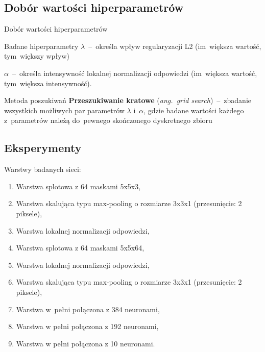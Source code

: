 \documentclass[xcolor=dvipsnames]{beamer}
\begin{document}
\subsection{Dobór wartości hiperparametrów}
\begin{frame}{Dobór wartości hiperparametrów}
    \begin{block}{Badane hiperparametry}
        \textbf{$\lambda$}~--~określa wpływ regularyzacji L2 (im~większa wartość, tym~większy wpływ)

        \vspace{2mm}
        \textbf{$\alpha$}~--~określa intensywność lokalnej normalizacji odpowiedzi (im~większa wartość,
        tym~większa intensywność).
    \end{block}
    \begin{block}{Metoda poszukiwań}
        \textbf{Przeszukiwanie kratowe} (\textit{ang.~grid search})~--~zbadanie wszystkich możliwych par parametrów
        $\lambda$ i~$\alpha$, gdzie badane wartości każdego z~parametrów należą do~pewnego skończonego dyskretnego
        zbioru
    \end{block}
\end{frame}
\subsection{Eksperymenty}
\begin{frame}
    Warstwy badanych sieci:
    \begin{enumerate}
        \item Warstwa splotowa z 64 maskami 5x5x3,
        \item Warstwa skalująca typu max-pooling o rozmiarze 3x3x1 (przesunięcie: 2 piksele),
        \item Warstwa lokalnej normalizacji odpowiedzi,
        \item Warstwa splotowa z 64 maskami 5x5x64,
        \item Warstwa lokalnej normalizacji odpowiedzi,
        \item Warstwa skalująca typu max-pooling o rozmiarze 3x3x1 (przesunięcie: 2 piksele),
        \item Warstwa w~pełni połączona z 384 neuronami,
        \item Warstwa w pełni połączona z 192 neuronami,
        \item Warstwa w pełni połączona z 10 neuronami.
    \end{enumerate}
\end{frame}
\end{document}
